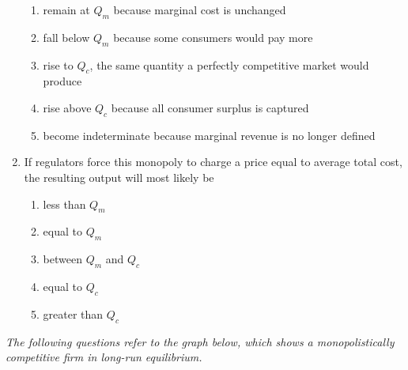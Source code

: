 \documentclass[10pt]{article}
\newenvironment{choiceslist}
  {\begin{enumerate}[label=(\Alph*), leftmargin=1.55em, itemsep=0.1em, topsep=0.15em, parsep=0pt]}
  {\end{enumerate}}
\newenvironment{stimulus}
  {\begin{center}\begin{minipage}{0.97\columnwidth}\footnotesize\itshape\setlength{\tabcolsep}{3pt}\renewcommand{\arraystretch}{0.96}}
  {\end{minipage}\end{center}}
\begin{document}
\begin{multicols*}{2}
\begin{enumerate}[resume*=curveq, leftmargin=*, itemsep=0.8em, topsep=0.18em, parsep=0pt]
\begin{choiceslist}
\item remain at $Q_m$ because marginal cost is unchanged
\item fall below $Q_m$ because some consumers would pay more
\item rise to $Q_c$, the same quantity a perfectly competitive market would produce
\item rise above $Q_c$ because all consumer surplus is captured
\item become indeterminate because marginal revenue is no longer defined
\end{choiceslist}
\item If regulators force this monopoly to charge a price equal to average total cost, the resulting output will most likely be
\begin{choiceslist}
\item less than $Q_m$
\item equal to $Q_m$
\item between $Q_m$ and $Q_c$
\item equal to $Q_c$
\item greater than $Q_c$
\end{choiceslist}
\end{enumerate}
\begin{stimulus}
The following questions refer to the graph below, which shows a monopolistically competitive firm in long-run equilibrium.


\end{stimulus}
\end{multicols*}
\end{document}
